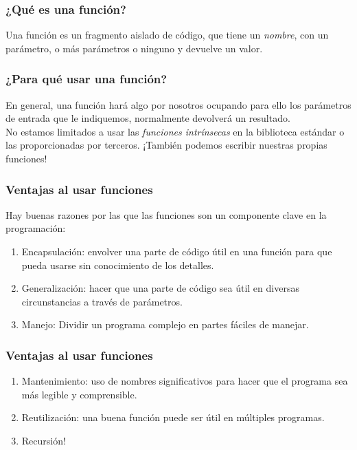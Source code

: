 \documentclass[12pt]{beamer}
\begin{document}
\begin{frame}
\frametitle{¿Qué es una función?}
Una función es un fragmento aislado de código, que tiene un \emph{nombre}, con un parámetro, o más parámetros o ninguno y devuelve un valor.
\end{frame}
\begin{frame}
\frametitle{¿Para qué usar una función?}
En general, una función hará algo por nosotros ocupando para ello los parámetros de entrada que le indiquemos, normalmente devolverá un resultado.
\\
\bigskip
\pause
No estamos limitados a usar las \emph{funciones intrínsecas} en la biblioteca estándar o las proporcionadas por terceros. \pause ¡También podemos escribir nuestras propias funciones!
\end{frame}
\begin{frame}   
\frametitle{Ventajas al usar funciones}
Hay buenas razones por las que las funciones son un componente clave en la programación:
\begin{enumerate}[<+->]
\item Encapsulación: envolver una parte de código útil en una función para que pueda usarse sin conocimiento de los detalles.
\item Generalización: hacer que una parte de código sea útil en diversas circunstancias a través de parámetros.
\item Manejo: Dividir un programa complejo en partes fáciles de manejar.
\seti
\end{enumerate}
\end{frame}
\begin{frame}
\frametitle{Ventajas al usar funciones}
\begin{enumerate}[<+->]
\conti
\item Mantenimiento: uso de nombres significativos para hacer que el programa sea más legible y comprensible.
\item Reutilización: una buena función puede ser útil en múltiples programas.
\item Recursión!
\end{enumerate}
\end{frame}
\end{document}

